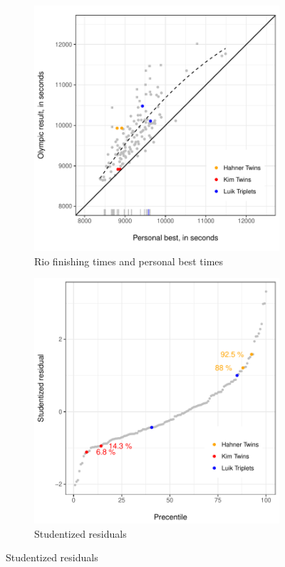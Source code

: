 \documentclass[12pt,titlepage]{article}
\begin{document}
\begin{figure}[!ht]
  \caption{Relationship between Personal Best and Result  -- caption?}
  \label{fig:scatter}
  \begin{subfigure}{.5\textwidth}
    \centering
    \includegraphics[width=\textwidth, keepaspectratio]{scatter_plot.pdf}
    \caption{Rio finishing times and personal best times}
    \label{fig:45degreeplot}
  \end{subfigure}
  \begin{subfigure}{.5\textwidth}
    \centering
    \includegraphics[width=.975\textwidth, keepaspectratio]{studentized_residuals.pdf}
    \caption{Studentized residuals}
    \label{fig:studentizedresiduals}
  \end{subfigure}
\end{figure}
\end{document}
